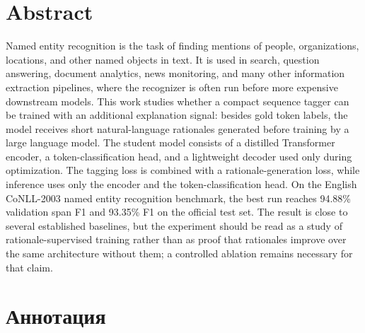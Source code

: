 \documentclass[a4paper,12pt]{extarticle}
\begin{document}

\newpage
\setcounter{page}{2}

{\hypersetup{linkcolor=black}\tableofcontents}

\newpage
\section*{Abstract}

Named entity recognition is the task of finding mentions of people, organizations, locations, and other named objects in text. It is used in search, question answering, document analytics, news monitoring, and many other information extraction pipelines, where the recognizer is often run before more expensive downstream models. This work studies whether a compact sequence tagger can be trained with an additional explanation signal: besides gold token labels, the model receives short natural-language rationales generated before training by a large language model. The student model consists of a distilled Transformer encoder, a token-classification head, and a lightweight decoder used only during optimization. The tagging loss is combined with a rationale-generation loss, while inference uses only the encoder and the token-classification head. On the English CoNLL-2003 named entity recognition benchmark, the best run reaches 94.88\% validation span F1 and 93.35\% F1 on the official test set. The result is close to several established baselines, but the experiment should be read as a study of rationale-supervised training rather than as proof that rationales improve over the same architecture without them; a controlled ablation remains necessary for that claim.

\section*{Аннотация}
\end{document}
